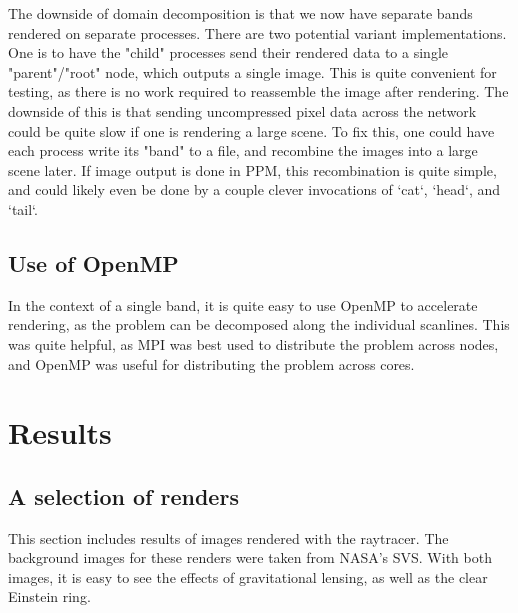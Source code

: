 The downside of domain decomposition is that we now have separate bands rendered on separate processes. There are two potential variant implementations. One is to have the "child" processes send their rendered data to a single "parent"/"root" node, which outputs a single image. This is quite convenient for testing, as there is no work required to reassemble the image after rendering. The downside of this is that sending uncompressed pixel data across the network could be quite slow if one is rendering a large scene. To fix this, one could have each process write its "band" to a file, and recombine the images into a large scene later. If image output is done in PPM, this recombination is quite simple, and could likely even be done by a couple clever invocations of `cat`, `head`, and `tail`.

\subsection {Use of OpenMP}

In the context of a single band, it is quite easy to use OpenMP to accelerate rendering, as the problem can be decomposed along the individual scanlines. This was quite helpful, as MPI was best used to distribute the problem across nodes, and OpenMP was useful for distributing the problem across cores. 


\section{Results}
\label{sec:results}

\subsection {A selection of renders}

This section includes results of images rendered with the raytracer. The background images for these renders were taken from NASA's SVS. With both images, it is easy to see the effects of gravitational lensing, as well as the clear Einstein ring. 


